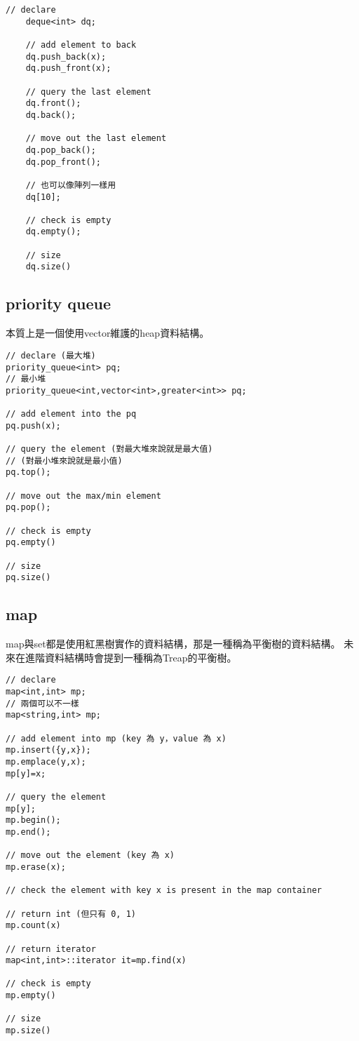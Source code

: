     \begin{lstlisting}[caption=deque 用法]
    // declare
    deque<int> dq;

    // add element to back
    dq.push_back(x);
    dq.push_front(x);

    // query the last element
    dq.front();
    dq.back();

    // move out the last element
    dq.pop_back();
    dq.pop_front();

    // 也可以像陣列一樣用
    dq[10];

    // check is empty
    dq.empty();

    // size
    dq.size()
    \end{lstlisting}

    \subsection{priority queue}

    本質上是一個使用vector維護的heap資料結構。

\begin{lstlisting}[caption=priority queue 用法]
// declare (最大堆)
priority_queue<int> pq;
// 最小堆
priority_queue<int,vector<int>,greater<int>> pq;

// add element into the pq
pq.push(x);

// query the element (對最大堆來說就是最大值)
// (對最小堆來說就是最小值)
pq.top();

// move out the max/min element
pq.pop();

// check is empty
pq.empty()
    
// size
pq.size()
\end{lstlisting}

    \subsection{map}
    map與set都是使用紅黑樹實作的資料結構，那是一種稱為平衡樹的資料結構。
    未來在進階資料結構時會提到一種稱為Treap的平衡樹。

\begin{lstlisting}[caption=map 用法]
// declare
map<int,int> mp;
// 兩個可以不一樣
map<string,int> mp;

// add element into mp (key 為 y，value 為 x)
mp.insert({y,x});
mp.emplace(y,x);
mp[y]=x;

// query the element
mp[y];
mp.begin();
mp.end();

// move out the element (key 為 x)
mp.erase(x);

// check the element with key x is present in the map container

// return int (但只有 0, 1)
mp.count(x)

// return iterator
map<int,int>::iterator it=mp.find(x)

// check is empty
mp.empty()
        
// size
mp.size()
\end{lstlisting}

